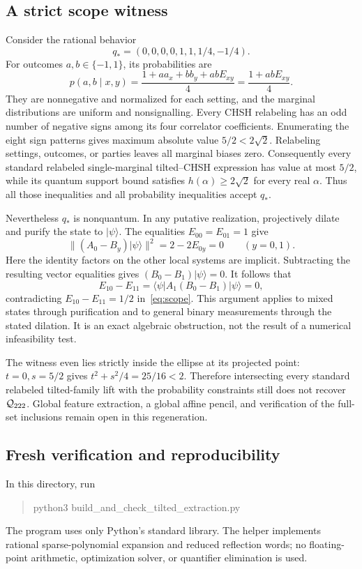 \subsection{A strict scope witness}
Consider the rational behavior
\begin{equation}\label{eq:scope}
 q_*=(0,0,0,0,1,1,1/4,-1/4).
\end{equation}
For outcomes $a,b\in\{-1,1\}$, its probabilities are
\[
 p(a,b\mid x,y)=\frac{1+a a_x+b b_y+abE_{xy}}4
               =\frac{1+abE_{xy}}4.
\]
They are nonnegative and normalized for each setting, and the marginal distributions are uniform and nonsignalling. Every CHSH relabeling has an odd number of negative signs among its four correlator coefficients. Enumerating the eight sign patterns gives maximum absolute value $5/2<2\sqrt2$. Relabeling settings, outcomes, or parties leaves all marginal biases zero. Consequently every standard relabeled single-marginal tilted--CHSH expression has value at most $5/2$, while its quantum support bound satisfies $h(\alpha)\ge2\sqrt2$ for every real $\alpha$. Thus all those inequalities and all probability inequalities accept $q_*$.

Nevertheless $q_*$ is nonquantum. In any putative realization, projectively dilate and purify the state to $|\psi\rangle$. The equalities $E_{00}=E_{01}=1$ give
\[
 \|(A_0-B_y)|\psi\rangle\|^2=2-2E_{0y}=0
       \qquad(y=0,1).
\]
Here the identity factors on the other local systems are implicit. Subtracting the resulting vector equalities gives $(B_0-B_1)|\psi\rangle=0$. It follows that
\[
 E_{10}-E_{11}=\langle\psi|A_1(B_0-B_1)|\psi\rangle=0,
\]
contradicting $E_{10}-E_{11}=1/2$ in~\eqref{eq:scope}. This argument applies to mixed states through purification and to general binary measurements through the stated dilation. It is an exact algebraic obstruction, not the result of a numerical infeasibility test.

The witness even lies strictly inside the ellipse at its projected point: $t=0,s=5/2$ gives $t^2+s^2/4=25/16<2$. Therefore intersecting every standard relabeled tilted-family lift with the probability constraints still does not recover ${\mathcal Q_{222}}$. Global feature extraction, a global affine pencil, and verification of the full-set inclusions remain open in this regeneration.

\subsection{Fresh verification and reproducibility}
In this directory, run
\begin{quote}\small\ttfamily
python3 build\_and\_check\_tilted\_extraction.py
\end{quote}
The program uses only Python's standard library. The helper implements rational sparse-polynomial expansion and reduced reflection words; no floating-point arithmetic, optimization solver, or quantifier elimination is used.

